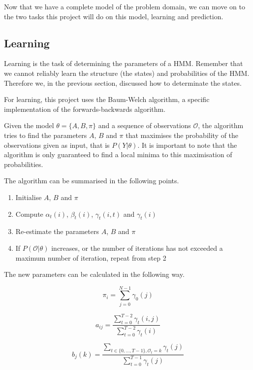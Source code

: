 Now that we have a complete model of the problem domain, we can move on to the two tasks this project will do on this model, learning and prediction.

\subsection{Learning}
Learning is the task of determining the parameters of a HMM. Remember that we cannot reliably learn the structure (the states) and probabilities of the HMM. Therefore we, in the previous section, discussed how to determinate the states.

For learning, this project uses the Baum-Welch algorithm, a specific implementation of the forwards-backwards algorithm. 

Given the model $\theta = \{A, B, \pi\}$ and a sequence of observations $\mathcal{O}$, the algorithm tries to find the parameters $A$, $B$ and $\pi$ that maximises the probability of the observations given as input, that is $P(Y | \theta)$. It is important to note that the algorithm is only guaranteed to find a local minima to this maximisation of probabilities.

The algorithm can be summarised in the following points\cite{hmmIntroduction}.

\begin{enumerate}
\item Initialise $A$, $B$ and $\pi$
\item Compute $\alpha_t(i)$, $\beta_t(i)$, $\gamma_t(i,t)$ and $\gamma_t(i)$
\item Re-estimate the parameters $A$, $B$ and $\pi$
\item If $P(\mathcal{O} | \theta)$ increases, or the number of iterations has not exceeded a maximum number of iteration, repeat from step 2
\end{enumerate}

The new parameters can be calculated in the following way\cite{hmmIntroduction}.

\begin{equation*}
\pi_i = \sum\limits_{j=0}^{N-1} \gamma_0(j)
\end{equation*}

\begin{equation*}
a_{ij} = \frac{\sum\limits_{t=0}^{T-2} \gamma_t(i, j)}{ \sum\limits_{t=0}^{T-2} \gamma_t(i) }
\end{equation*}

\begin{equation*}
b_j(k) = \frac{ \sum\limits_{t \in \{0,\ldots, T-1\}, \mathcal{O}_t = k} \gamma_t(j) } { \sum\limits_{t=0}^{T-1} \gamma_t(j) }
\end{equation*}

